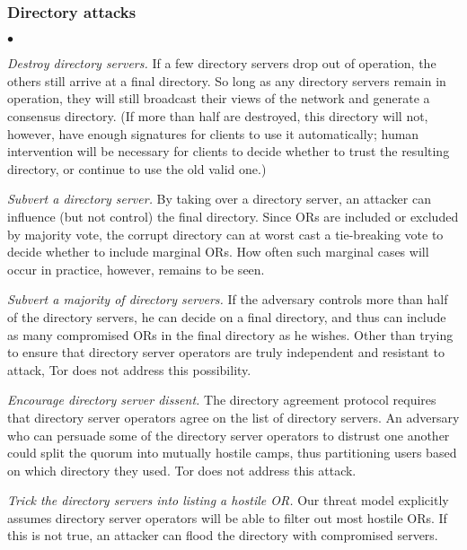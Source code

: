 \documentclass[times,10pt,twocolumn]{article}
\newenvironment{tightlist}{\begin{list}{$\bullet$}{
  \setlength{\itemsep}{0mm}
    \setlength{\parsep}{0mm}
    }}{\end{list}}
\begin{document}
\subsubsection*{Directory attacks}
\begin{tightlist}
\item \emph{Destroy directory servers.}  If a few directory
  servers drop out of operation, the others still arrive at a final
  directory.  So long as any directory servers remain in operation,
  they will still broadcast their views of the network and generate a
  consensus directory.  (If more than half are destroyed, this
  directory will not, however, have enough signatures for clients to
  use it automatically; human intervention will be necessary for
  clients to decide whether to trust the resulting directory, or continue
  to use the old valid one.)

\item \emph{Subvert a directory server.}  By taking over a directory
  server, an attacker can influence (but not control) the final
  directory.  Since ORs are included or excluded by majority vote,
  the corrupt directory can at worst cast a tie-breaking vote to
  decide whether to include marginal ORs.  How often such marginal
  cases will occur in practice, however, remains to be seen.

\item \emph{Subvert a majority of directory servers.}  If the
  adversary controls more than half of the directory servers, he can
  decide on a final directory, and thus can include as many
  compromised ORs in the final directory as he wishes.  Other than
  trying to ensure that directory server operators are truly
  independent and resistant to attack, Tor does not address this
  possibility.

\item \emph{Encourage directory server dissent.}  The directory
  agreement protocol requires that directory server operators agree on 
  the list of directory servers.  An adversary who can persuade some
  of the directory server operators to distrust one another could
  split the quorum into mutually hostile camps, thus partitioning
  users based on which directory they used.  Tor does not address
  this attack.

\item \emph{Trick the directory servers into listing a hostile OR.}
  Our threat model explicitly assumes directory server operators will
  be able to filter out most hostile ORs.  If this is not true, an
  attacker can flood the directory with compromised servers.


\end{tightlist}
\end{document}

